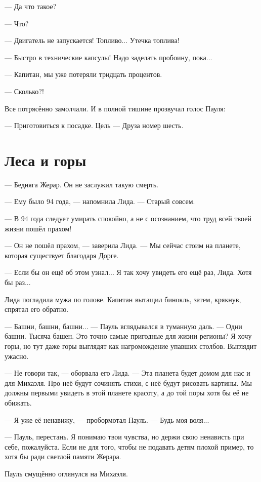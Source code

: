 --- Да что такое?

--- Что?

--- Двигатель не запускается!
Топливо...
Утечка топлива!

--- Быстро в технические капсулы!
Надо заделать пробоину, пока...

--- Капитан, мы уже потеряли тридцать процентов.

--- Сколько?!

Все потрясённо замолчали.
И в полной тишине прозвучал голос Пауля:

--- Приготовиться к посадке.
Цель --- Друза номер шесть.

\section{Леса и горы}

--- Бедняга Жерар.
Он не заслужил такую смерть.

--- Ему было 94 года, --- напомнила Лида.
--- Старый совсем.

--- В 94 года следует умирать спокойно, а не с осознанием, что труд всей твоей жизни пошёл прахом!

--- Он не пошёл прахом, --- заверила Лида.
--- Мы сейчас стоим на планете, которая существует благодаря Дорге.

--- Если бы он ещё об этом узнал...
Я так хочу увидеть его ещё раз, Лида.
Хотя бы раз...

Лида погладила мужа по голове.
Капитан вытащил бинокль, затем, крякнув, спрятал его обратно.

--- Башни, башни, башни... --- Пауль вглядывался в туманную даль.
--- Одни башни.
Тысяча башен.
Это точно самые пригодные для жизни регионы?
Я хочу горы, но тут даже горы выглядят как нагромождение упавших столбов.
Выглядит ужасно.

--- Не говори так, --- оборвала его Лида.
--- Эта планета будет домом для нас и для Михаэля.
Про неё будут сочинять стихи, с неё будут рисовать картины.
Мы должны первыми увидеть в этой планете красоту, а до той поры хотя бы её не обижать.

--- Я уже её ненавижу, --- пробормотал Пауль.
--- Будь моя воля...

--- Пауль, перестань.
Я понимаю твои чувства, но держи свою ненависть при себе, пожалуйста.
Если не для того, чтобы не подавать детям плохой пример, то хотя бы ради светлой памяти Жерара.

Пауль смущённо оглянулся на Михаэля.

